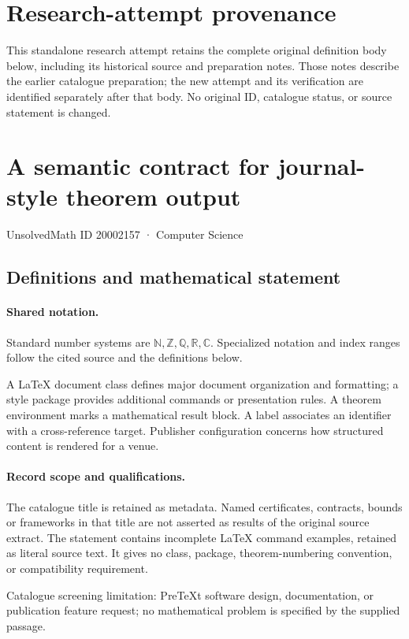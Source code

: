 \documentclass[11pt]{article}
\begin{document}
\section*{Research-attempt provenance}
This standalone research attempt retains the complete original definition body below,
including its historical source and preparation notes. Those notes describe the
earlier catalogue preparation; the new attempt and its verification are identified
separately after that body. No original ID, catalogue status, or source statement is changed.

\section{A semantic contract for journal-style theorem output}\label{20002157}
{\small UnsolvedMath ID 20002157 · Computer Science}
\subsection{Definitions and mathematical statement}

\paragraph{Shared notation.}Standard number systems are $\mathbb N,\mathbb Z,\mathbb Q,\mathbb R,\mathbb C$. Specialized notation and index ranges follow the cited source and the definitions below.


A LaTeX document class defines major document organization and formatting; a style package provides additional commands or presentation rules. A theorem environment marks a mathematical result block. A label associates an identifier with a cross-reference target. Publisher configuration concerns how structured content is rendered for a venue.
\paragraph{Record scope and qualifications.}
The catalogue title is retained as metadata. Named certificates, contracts, bounds or frameworks in that title are not asserted as results of the original source extract.
The statement contains incomplete LaTeX command examples, retained as literal source text. It gives no class, package, theorem-numbering convention, or compatibility requirement.

Catalogue screening limitation: PreTeXt software design, documentation, or publication feature request; no mathematical problem is specified by the supplied passage.
\end{document}
